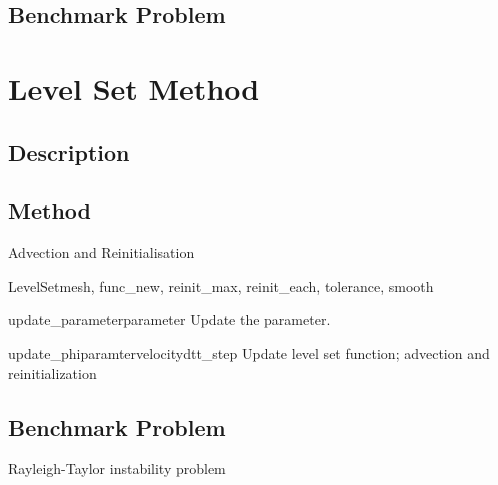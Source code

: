 \subsection{Benchmark Problem}


\section{Level Set Method}

\subsection{Description}

\subsection{Method}

Advection and Reinitialisation

\begin{classdesc}{LevelSet}{mesh, func\_new, reinit\_max, reinit\_each, tolerance, smooth}
\end{classdesc}



\begin{methoddesc}[LevelSet]{update\_parameter}{parameter}
Update the parameter.
\end{methoddesc}

\begin{methoddesc}[LevelSet]{update\_phi}{paramter}{velocity}{dt}{t\_step}
Update level set function; advection and reinitialization
\end{methoddesc}

\subsection{Benchmark Problem}

Rayleigh-Taylor instability problem



